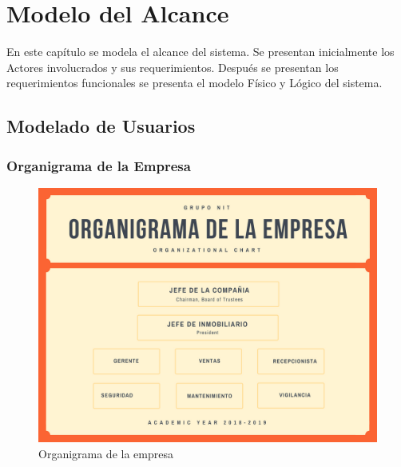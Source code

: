 \chapter{Modelo del Alcance}
\label{cap:reqUsr}

	En este capítulo se modela el alcance del sistema. Se presentan inicialmente los Actores involucrados y sus requerimientos. Después se presentan los requerimientos funcionales se presenta el modelo Físico y Lógico del sistema.


\section{Modelado de Usuarios}

\subsection{Organigrama de la Empresa}



\begin{figure}[htbp]
	\begin{center}
		\includegraphics[width=.8\textwidth]{images/Organigrama}
		\caption{Organigrama de la empresa}
		\label{fig:organigrama}
	\end{center}
\end{figure}

